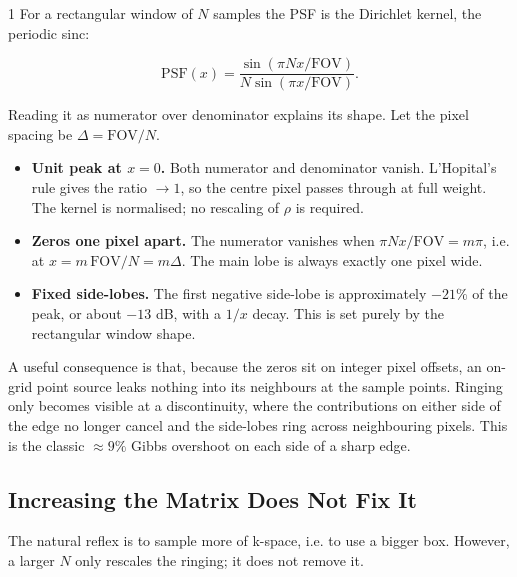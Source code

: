 \begin{spacing}{1}
For a rectangular window of \(N\) samples the PSF is the Dirichlet kernel,
the periodic sinc:

\begin{equation}
    \mathrm{PSF}(x) =
    \frac{\sin(\pi N x/\mathrm{FOV})}
         {N\sin(\pi x/\mathrm{FOV})}.
\end{equation}

Reading it as numerator over denominator explains its shape. Let the
pixel spacing be \(\Delta=\mathrm{FOV}/N\).

\begin{itemize}
    \item \textbf{Unit peak at \(x=0\).} Both numerator and denominator
    vanish. L'Hopital's rule gives the ratio \(\to 1\), so the centre
    pixel passes through at full weight. The kernel is normalised; no
    rescaling of \(\rho\) is required.
    \item \textbf{Zeros one pixel apart.} The numerator vanishes when
    \(\pi N x/\mathrm{FOV}=m\pi\), i.e. at
    \(x=m\,\mathrm{FOV}/N=m\Delta\). The main lobe is always exactly one
    pixel wide.
    \item \textbf{Fixed side-lobes.} The first negative side-lobe is
    approximately \(-21\%\) of the peak, or about \(-13\) dB, with a
    \(1/x\) decay. This is set purely by the rectangular window shape.
\end{itemize}

A useful consequence is that, because the zeros sit on integer pixel
offsets, an on-grid point source leaks nothing into its neighbours at the
sample points. Ringing only becomes visible at a discontinuity, where the
contributions on either side of the edge no longer cancel and the
side-lobes ring across neighbouring pixels. This is the classic
\(\approx 9\%\) Gibbs overshoot on each side of a sharp edge.

\subsection{Increasing the Matrix Does Not Fix It}

The natural reflex is to sample more of k-space, i.e. to use a bigger
box. However, a larger \(N\) only rescales the ringing; it does not
remove it.


\end{spacing}
